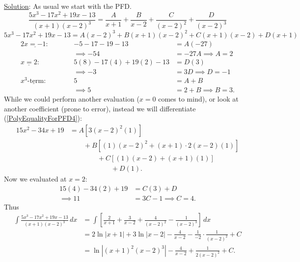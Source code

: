 \underline{Solution}: As usual we start with the PFD.
$$\frac{5x^3-17x^2+19x-13}{(x+1)(x-2)^3}
=\frac{A}{x+1}+\frac{B}{x-2}+\frac{C}{(x-2)^2}+\frac{D}{(x-2)^3}$$
\begin{equation}
5x^3-17x^2+19x-13
 =A(x-2)^3+B(x+1)(x-2)^2+C(x+1)(x-2)+D(x+1)
\label{PolyEqualityForPFD4}\end{equation}
\begin{alignat*}{2}
\underline{x=-1}:&\qquad&-5-17-19-13&=A(-27)\\
                 &&\implies-54&=-27A\implies\boxed{A=2}\\
\underline{x=2}:&\qquad&5(8)-17(4)+19(2)-13&=D(3)\\
                &&\implies-3&=3D\implies\boxed{D=-1}\\
\underline{x^3\text{-term}:}&&5&=A+B\\
                &&\implies 5&=2+B\implies\boxed{B=3}.
\end{alignat*}
While we could perform another evaluation ($x=0$ comes to mind),
or look at another coefficient (prone to error), instead we will
differentiate (\ref{PolyEqualityForPFD4}):
\begin{align*}
15x^2-34x+19&=A[3(x-2)^2(1)]\\
             &\qquad+B[(1)(x-2)^2+(x+1)\cdot2(x-2)(1)]\\
             &\qquad\qquad+C[(1)(x-2)+(x+1)(1)]\\
             &\qquad\qquad\qquad+D(1).\end{align*}
Now we evaluated at $x=2$:
\begin{align*}
15(4)-34(2)+19&=C(3)+D\\\implies 11&=3C-1\implies \boxed{C=4}.
\end{align*}
Thus
\begin{align*}
\int\frac{5x^3-17x^2+19x-13}{(x+1)(x-2)^3}\,dx
&=
\int\left[\frac2{x+1}+\frac3{x-2}+\frac4{(x-2)^2}-\frac1{(x-2)^3}\right]\,dx\\
&=2\ln|x+1|+3\ln|x-2|-\frac4{x-2}-\frac1{-2}\cdot\frac1{(x-2)^2}+C\\
&=\ln\left|(x+1)^2(x-2)^3\right|-\frac4{x-2}+\frac1{2(x-2)^2}+C.
\end{align*}


\eex

